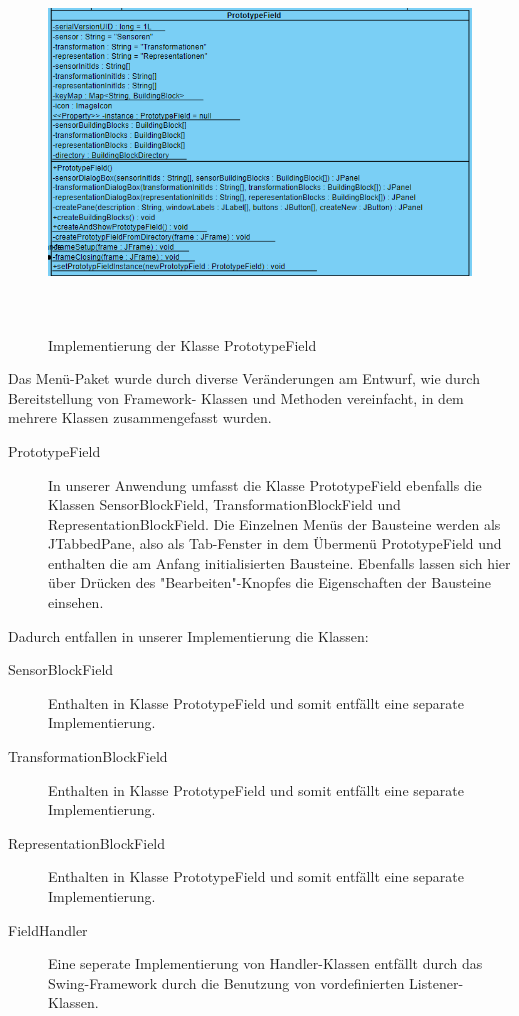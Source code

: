 \documentclass[parskip=full]{scrartcl}
\begin{document}
\begin{figure}[htbp]
    \begin{center}
        \includegraphics[height = 10cm]{Grafiken/PrototypeField.png}
        \caption{Implementierung der Klasse PrototypeField}
        \label{prot}
    \end{center}
\end{figure}


Das Menü-Paket wurde durch diverse Veränderungen am Entwurf, wie durch Bereitstellung von Framework- Klassen und Methoden vereinfacht, in dem mehrere Klassen zusammengefasst wurden.

\begin{description}
\item[PrototypeField] In unserer Anwendung umfasst die Klasse PrototypeField ebenfalls die Klassen SensorBlockField, TransformationBlockField und RepresentationBlockField. Die Einzelnen Menüs der Bausteine werden als JTabbedPane, also als Tab-Fenster in dem Übermenü PrototypeField und enthalten die am Anfang initialisierten Bausteine. Ebenfalls lassen sich hier über Drücken des "Bearbeiten"-Knopfes die Eigenschaften der Bausteine einsehen. 
\end{description}

Dadurch entfallen in unserer Implementierung die Klassen:

\begin{description}
\item[SensorBlockField] Enthalten in Klasse PrototypeField und somit entfällt eine separate Implementierung.
\item[TransformationBlockField] Enthalten in Klasse PrototypeField und somit entfällt eine separate Implementierung.
\item[RepresentationBlockField] Enthalten in Klasse PrototypeField und somit entfällt eine separate Implementierung.
\item[FieldHandler] Eine seperate Implementierung von Handler-Klassen entfällt durch das Swing-Framework durch die Benutzung von vordefinierten Listener-Klassen.
\end{description}
\end{document}
